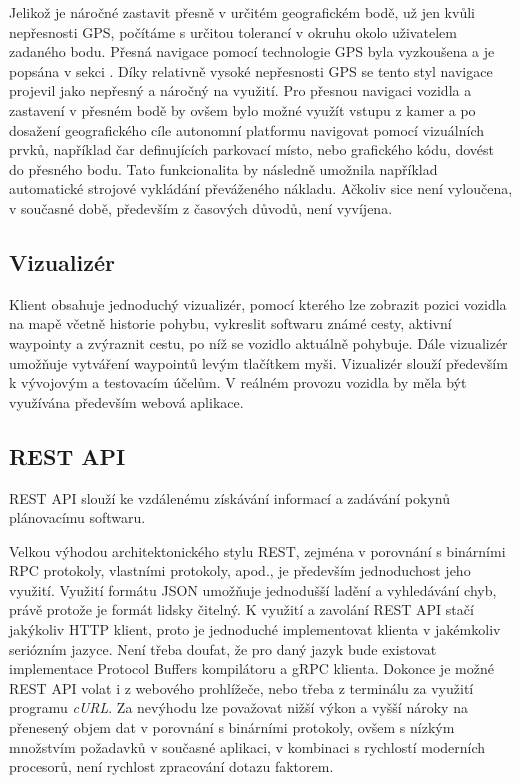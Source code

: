 \documentclass[czech,bachelor,dept460,male,cpp,cpdeclaration]{diploma}
\begin{document}
Jelikož je náročné zastavit přesně v určitém geografickém bodě, už jen kvůli nepřesnosti GPS, počítáme s určitou tolerancí
v okruhu okolo uživatelem zadaného bodu. Přesná navigace pomocí technologie GPS byla vyzkoušena a je popsána v sekci
. Díky relativně vysoké nepřesnosti GPS se tento styl navigace projevil jako nepřesný a náročný na využití.
Pro přesnou navigaci vozidla a zastavení v přesném bodě by ovšem bylo možné využít vstupu z kamer a po dosažení geografického cíle
autonomní platformu navigovat pomocí vizuálních prvků, například čar definujících parkovací místo, nebo grafického kódu, dovést
do přesného bodu. Tato funkcionalita by následně umožnila například automatické strojové vykládání převáženého nákladu. Ačkoliv 
sice není vyloučena, v současné době, především z časových důvodů, není vyvíjena.

\subsection{Vizualizér} \label{visualizer}

Klient obsahuje jednoduchý vizualizér, pomocí kterého lze zobrazit pozici vozidla na mapě včetně historie pohybu, vykreslit 
softwaru známé cesty, aktivní waypointy a zvýraznit cestu, po níž se vozidlo aktuálně pohybuje. Dále vizualizér umožňuje vytváření 
waypointů levým tlačítkem myši. Vizualizér slouží především k vývojovým a testovacím účelům. V reálném provozu vozidla by měla
být využívána především webová aplikace. 

\subsection{REST API} \label{rest-api}

REST API slouží ke vzdálenému získávání informací a zadávání pokynů plánovacímu softwaru.

Velkou výhodou architektonického stylu REST, zejména v porovnání s binárními RPC protokoly, vlastními protokoly, apod., je 
především jednoduchost jeho využití. Využití formátu JSON umožňuje jednodušší ladění a vyhledávání chyb, právě protože je formát
lidsky čitelný. K využití a zavolání REST API stačí jakýkoliv HTTP klient, proto je jednoduché implementovat klienta v jakémkoliv
seriózním jazyce. Není třeba doufat, že pro daný jazyk bude existovat implementace Protocol Buffers kompilátoru a gRPC klienta. 
Dokonce je možné REST API volat i z webového prohlížeče, nebo třeba z terminálu za využití programu \emph{cURL}. Za nevýhodu lze
považovat nižší výkon a vyšší nároky na přenesený objem dat v porovnání s binárními protokoly, ovšem s nízkým množstvím požadavků
v současné aplikaci, v kombinaci s rychlostí moderních procesorů, není rychlost zpracování dotazu faktorem.
\end{document}
